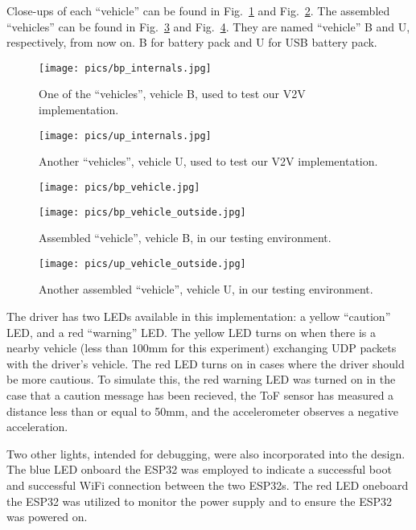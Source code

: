\documentclass[conference]{IEEEtran}
\begin{document}
Close-ups of each ``vehicle'' can be found in Fig.~\ref{vehicle_bp} and
Fig.~\ref{vehicle_up}. The assembled ``vehicles'' can be found in
Fig.~\ref{bp_outside} and Fig.~\ref{up_outside}. They are named ``vehicle'' B
and U, respectively, from now on. B for battery pack and U for USB battery pack.

\begin{figure}[htbp]
\centerline{\texttt{[image: pics/bp\_internals.jpg]}}
\caption{One of the ``vehicles'', vehicle B, used to test our V2V implementation.}
\label{vehicle_bp}
\end{figure}

\begin{figure}[htbp]
\centerline{\texttt{[image: pics/up\_internals.jpg]}}
\caption{Another ``vehicles'', vehicle U, used to test our V2V implementation.}
\label{vehicle_up}
\end{figure}

\begin{figure}[htbp]
\centerline{\texttt{[image: pics/bp\_vehicle.jpg]}}
\centerline{\texttt{[image: pics/bp\_vehicle\_outside.jpg]}}
\caption{Assembled ``vehicle'', vehicle B, in our testing environment.}
\label{bp_outside}
\end{figure}

\begin{figure}[htbp]
\centerline{\texttt{[image: pics/up\_vehicle\_outside.jpg]}}
\caption{Another assembled ``vehicle'', vehicle U, in our testing environment.}
\label{up_outside}
\end{figure}

The driver has two LEDs available in this implementation: a yellow ``caution''
LED, and a red ``warning'' LED. The yellow LED turns on when there is a nearby vehicle
(less than 100mm for this experiment) exchanging UDP packets with the driver's vehicle.
The red LED turns on in cases where the driver should be more cautious. To simulate this,
the red warning LED was turned on in the case that a caution message has been recieved, 
the ToF sensor has measured a distance less than or equal to 50mm, and the accelerometer
observes a negative acceleration.

Two other lights, intended for debugging, were also incorporated into the design. The blue
LED onboard the ESP32 was employed to indicate a successful boot and successful WiFi
connection between the two ESP32s. The red LED oneboard the ESP32 was utilized to 
monitor the power supply and to ensure the ESP32 was powered on.
\end{document}
